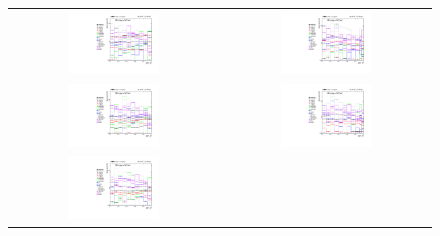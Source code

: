 \begin{figure}[tbh!]
 \begin{center}
 \begin{tabular}{cc}
  \includegraphics[width=0.45\textwidth]{figures/Part3/Systematics/sysBDT_ST_sig_2016}&
  \includegraphics[width=0.45\textwidth]{figures/Part3/Systematics/sysBDT_TT_sig_2016} \\
    \includegraphics[width=0.45\textwidth]{figures/Part3/Systematics/sysBDT_ST_sig_2017}&
  \includegraphics[width=0.45\textwidth]{figures/Part3/Systematics/sysBDT_TT_sig_2017} \\
    \includegraphics[width=0.45\textwidth]{figures/Part3/Systematics/sysBDT_ST_sig_2018}&

\end{tabular}
\end{center}
\end{figure}
